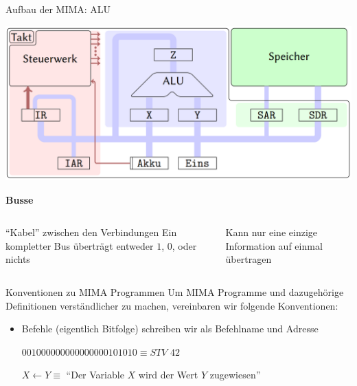 \documentclass[handout]{beamer}
\begin{document}
\begin{frame}{Aufbau der MIMA: ALU}
\begin{center}\includegraphics[width=.6\textwidth]{images/mima_aufbau.png}\end{center}

\bp

\textbf{Busse}

\begin{columns}
	\begin{column}{0.5\textwidth}
		\begin{itemize}
			\pitem ``Kabel'' zwischen den Verbindungen
			\pitem Ein kompletter Bus überträgt entweder $1$, $0$, oder nichts
		\end{itemize}
	\end{column}
	
	\begin{column}{0.5\textwidth}
		\begin{itemize}
			\pitem Kann nur eine einzige Information auf einmal übertragen
		\end{itemize}
	\end{column}
\end{columns}

\end{frame}

\begin{frame}{Konventionen zu MIMA Programmen}
	Um MIMA Programme und dazugehörige Definitionen verständlicher zu machen, vereinbaren wir folgende Konventionen:
	
	\bp
	
	\begin{itemize}
		\item Befehle (eigentlich Bitfolge) schreiben wir als Befehlname und Adresse
		\begin{itemize}
			\pitem $001000000000000000101010 \equiv STV$ $42$
		\end{itemize}
		\pitem $X \leftarrow Y \equiv $ ``Der Variable $X$ wird der Wert $Y$ zugewiesen''
		
	\end{itemize}
	
	
\end{frame}
\end{document}
